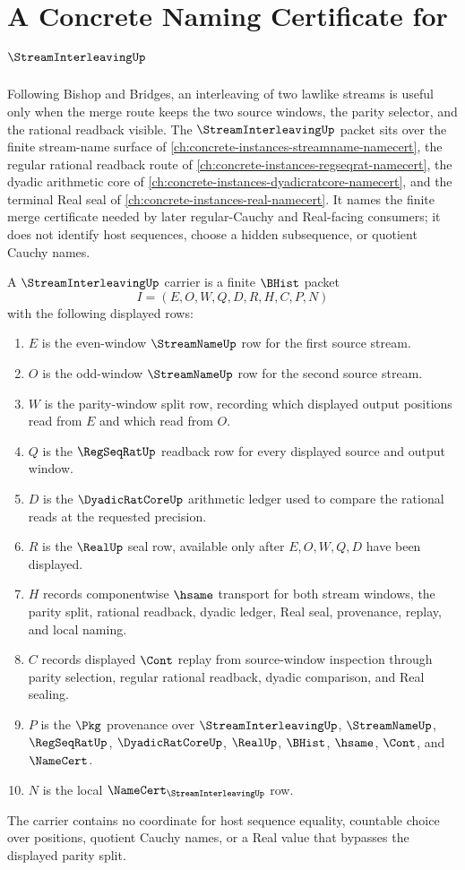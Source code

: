 \chapter{A Concrete Naming Certificate for $\StreamInterleavingUp$}
\label{ch:concrete-instances-stream-interleaving-namecert}

Following Bishop and Bridges, an interleaving of two lawlike streams is useful only when the merge route keeps the two source windows, the parity selector, and the rational readback visible. The $\StreamInterleavingUp$ packet sits over the finite stream-name surface of \autoref{ch:concrete-instances-streamname-namecert}, the regular rational readback route of \autoref{ch:concrete-instances-regseqrat-namecert}, the dyadic arithmetic core of \autoref{ch:concrete-instances-dyadicratcore-namecert}, and the terminal Real seal of \autoref{ch:concrete-instances-real-namecert}. It names the finite merge certificate needed by later regular-Cauchy and Real-facing consumers; it does not identify host sequences, choose a hidden subsequence, or quotient Cauchy names.

\begin{definition}
\label{def:stream-interleaving-carrier}
A $\StreamInterleavingUp$ carrier is a finite $\BHist$ packet
$$
I=(E,O,W,Q,D,R,H,C,P,N)
$$
with the following displayed rows:
\begin{enumerate}
\item $E$ is the even-window $\StreamNameUp$ row for the first source stream.
\item $O$ is the odd-window $\StreamNameUp$ row for the second source stream.
\item $W$ is the parity-window split row, recording which displayed output positions read from $E$ and which read from $O$.
\item $Q$ is the $\RegSeqRatUp$ readback row for every displayed source and output window.
\item $D$ is the $\DyadicRatCoreUp$ arithmetic ledger used to compare the rational reads at the requested precision.
\item $R$ is the $\RealUp$ seal row, available only after $E,O,W,Q,D$ have been displayed.
\item $H$ records componentwise $\hsame$ transport for both stream windows, the parity split, rational readback, dyadic ledger, Real seal, provenance, replay, and local naming.
\item $C$ records displayed $\Cont$ replay from source-window inspection through parity selection, regular rational readback, dyadic comparison, and Real sealing.
\item $P$ is the $\Pkg$ provenance over $\StreamInterleavingUp$, $\StreamNameUp$, $\RegSeqRatUp$, $\DyadicRatCoreUp$, $\RealUp$, $\BHist$, $\hsame$, $\Cont$, and $\NameCert$.
\item $N$ is the local $\NameCert_{\StreamInterleavingUp}$ row.
\end{enumerate}
The carrier contains no coordinate for host sequence equality, countable choice over positions, quotient Cauchy names, or a Real value that bypasses the displayed parity split.
\end{definition}

